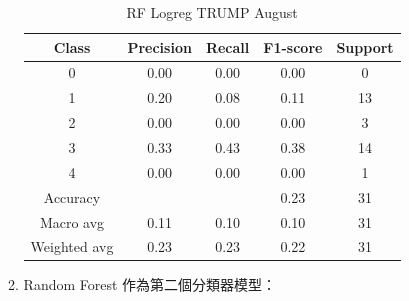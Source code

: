 \begin{enumerate}
\begin{enumerate}
\begin{table}[H]
                \vspace{1em} %
                
                \scriptsize
                \begin{tabular}{c|cccc}
                \hline
                Class & Precision & Recall & F1-score & Support \\
                \hline
                0 & 0.00 & 0.00 & 0.00 & 0 \\
                1 & 0.20 & 0.08 & 0.11 & 13 \\
                2 & 0.00 & 0.00 & 0.00 & 3 \\
                3 & 0.33 & 0.43 & 0.38 & 14 \\
                4 & 0.00 & 0.00 & 0.00 & 1 \\
                \hline
                Accuracy &       &      & 0.23 & 31 \\
                Macro avg & 0.11 & 0.10 & 0.10 & 31 \\
                Weighted avg & 0.23 & 0.23 & 0.22 & 31 \\
                \hline
                \end{tabular}
                \caption{RF Logreg TRUMP August}
                \label{tab:classifier_2_report_rf_logreg_trump_non_filtered_aug}
                \end{table}


                \pagebreak
    
                \item Random Forest 作為第二個分類器模型：


\end{enumerate}
\end{enumerate}
